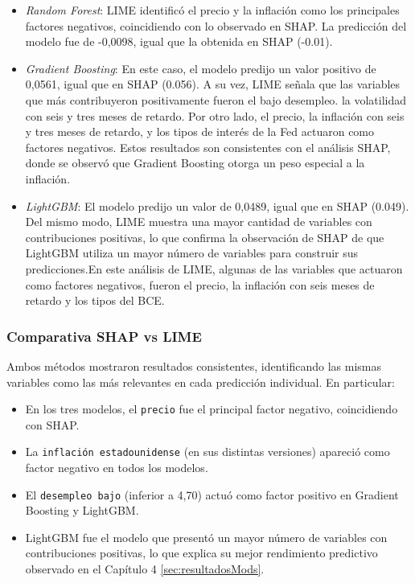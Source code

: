 \begin{itemize}
    \item \emph{Random Forest}: LIME identificó el precio y la inflación como los principales factores negativos, coincidiendo con lo observado en SHAP. La predicción del modelo fue de -0,0098, igual que la obtenida en SHAP (-0.01).
    \item \emph{Gradient Boosting}: En este caso, el modelo predijo un valor positivo de 0,0561, igual que en SHAP (0.056). A su vez, LIME señala que las variables que más contribuyeron positivamente fueron el bajo desempleo. la volatilidad con seis y tres meses de retardo. Por otro lado, el precio, la inflación con seis y tres meses de retardo, y los tipos de interés de la Fed actuaron como factores negativos. Estos resultados son consistentes con el análisis SHAP, donde se observó que Gradient Boosting otorga un peso especial a la inflación.
    \item \emph{LightGBM}: El modelo predijo un valor de 0,0489, igual que en SHAP (0.049). Del mismo modo, LIME muestra una mayor cantidad de variables con contribuciones positivas, lo que confirma la observación de SHAP de que LightGBM utiliza un mayor número de variables para construir sus predicciones.En este  análisis de LIME, algunas de las variables que actuaron como factores negativos, fueron el precio, la inflación con seis meses de retardo y los tipos del BCE.
\end{itemize}

\subsubsection{Comparativa SHAP vs LIME}
Ambos métodos mostraron resultados consistentes, identificando las mismas variables como las más relevantes en cada predicción individual. En particular:

\begin{itemize}
    \item En los tres modelos, el \texttt{precio} fue el principal factor negativo, coincidiendo con SHAP.
    \item La \texttt{inflación estadounidense} (en sus distintas versiones) apareció como factor negativo en todos los modelos.
    \item El \texttt{desempleo bajo} (inferior a 4,70) actuó como factor positivo en Gradient Boosting y LightGBM.
    \item LightGBM fue el modelo que presentó un mayor número de variables con contribuciones positivas, lo que explica su mejor rendimiento predictivo observado en el Capítulo 4 \ref{sec:resultadosMods}.
\end{itemize}

